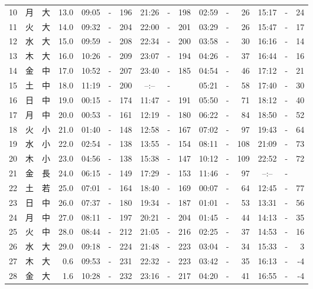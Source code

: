 \documentclass[12pt.a4j]{jsarticle}
\begin{document}
\begin{center}
\begin{table}[ht]
\begin{tabular}{|rc|cr|ccrccr|ccrccr|}
10 & 月 & 大 & 13.0 &  09:05 &-& 196  &  21:26 &-& 198  &   02:59 &-&  26  &   15:17 &-&  24  \\
11 & 火 & 大 & 14.0 &  09:32 &-& 204  &  22:00 &-& 201  &   03:29 &-&  26  &   15:47 &-&  17  \\
12 & 水 & 大 & 15.0 &  09:59 &-& 208  &  22:34 &-& 200  &   03:58 &-&  30  &   16:16 &-&  14  \\
13 & 木 & 大 & 16.0 &  10:26 &-& 209  &  23:07 &-& 194  &   04:26 &-&  37  &   16:44 &-&  16  \\
14 & 金 & 中 & 17.0 &  10:52 &-& 207  &  23:40 &-& 185  &   04:54 &-&  46  &   17:12 &-&  21  \\
15 & 土 & 中 & 18.0 &  11:19 &-& 200  &  --:-- &-&     &   05:21 &-&  58  &   17:40 &-&  30  \\
16 & 日 & 中 & 19.0 &  00:15 &-& 174  &  11:47 &-& 191  &   05:50 &-&  71  &   18:12 &-&  40  \\
17 & 月 & 中 & 20.0 &  00:53 &-& 161  &  12:19 &-& 180  &   06:22 &-&  84  &   18:50 &-&  52  \\
18 & 火 & 小 & 21.0 &  01:40 &-& 148  &  12:58 &-& 167  &   07:02 &-&  97  &   19:43 &-&  64  \\
19 & 水 & 小 & 22.0 &  02:54 &-& 138  &  13:55 &-& 154  &   08:11 &-& 108  &   21:09 &-&  73  \\
20 & 木 & 小 & 23.0 &  04:56 &-& 138  &  15:38 &-& 147  &   10:12 &-& 109  &   22:52 &-&  72  \\
21 & 金 & 長 & 24.0 &  06:15 &-& 149  &  17:29 &-& 153  &   11:46 &-&  97  &   --:-- &-&     \\
22 & 土 & 若 & 25.0 &  07:01 &-& 164  &  18:40 &-& 169  &   00:07 &-&  64  &   12:45 &-&  77  \\
23 & 日 & 中 & 26.0 &  07:37 &-& 180  &  19:34 &-& 187  &   01:01 &-&  53  &   13:31 &-&  56  \\
24 & 月 & 中 & 27.0 &  08:11 &-& 197  &  20:21 &-& 204  &   01:45 &-&  44  &   14:13 &-&  35  \\
25 & 火 & 中 & 28.0 &  08:44 &-& 212  &  21:05 &-& 216  &   02:25 &-&  37  &   14:53 &-&  16  \\
26 & 水 & 大 & 29.0 &  09:18 &-& 224  &  21:48 &-& 223  &   03:04 &-&  34  &   15:33 &-&   3  \\
27 & 木 & 大 &  0.6 &  09:53 &-& 231  &  22:32 &-& 223  &   03:42 &-&  35  &   16:13 &-&  -4  \\
28 & 金 & 大 &  1.6 &  10:28 &-& 232  &  23:16 &-& 217  &   04:20 &-&  41  &   16:55 &-&  -4  \\

\end{tabular}
\end{table}
\end{center}
\end{document}
